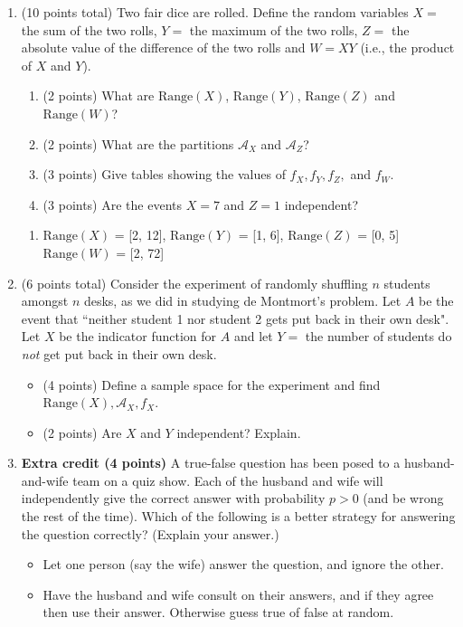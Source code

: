 \documentclass[11pt]{article}
\newcommand{\Range}{{\mathrm{Range}}}
\newcommand{\A}{{\mathcal{A}}}
\begin{document}
\begin{enumerate}
\item (10 points total) Two fair dice are rolled.  Define the random variables
$X =$ the sum of the two rolls,
$Y =$ the maximum of the two rolls,
$Z =$ the absolute value of the difference of the two rolls
and $W = XY$ (i.e., the product of $X$ and $Y$).
\begin{enumerate}
 \item (2 points) What are $\Range(X)$, $\Range(Y)$, $\Range(Z)$ and
 $\Range(W)$?

 \item (2 points) What are the partitions $\A_X$ and $\A_Z$?
 \item (3 points) Give tables showing the values of $f_X,f_Y,f_Z,$ and $f_W$.
 \item (3 points) Are the events $X =7$ and $Z=1$ independent?
\end{enumerate}

\begin{enumerate}
	\item $\Range(X)$ = [2, 12], $\Range(Y)$ = [1, 6], $\Range(Z)$ = [0, 5]
	$\Range(W)$ = [2, 72]
\end{enumerate}

\item (6 points total) Consider the experiment of randomly shuffling
$n$ students amongst $n$ desks, as we did in studying de Montmort's problem.
Let $A$ be the event that ``neither student 1 nor student 2 gets
put back in their own desk".
Let $X$ be the indicator function for $A$ and let $Y = $ the number of
students do \emph{not} get put back in their own desk.

\begin{itemize}
\item (4 points) Define a sample space for the experiment and find 
$\Range(X), \A_X, f_X$.
\item (2 points) Are $X$ and $Y$ independent?  Explain.
\end{itemize}

\item \textbf{Extra credit (4 points)} A true-false question has been
posed to a husband-and-wife team on a quiz show.  Each of the husband
and wife will independently give the correct answer with probability $p>0$
(and be wrong the rest of the time).
Which of the following is a better strategy for answering the question 
correctly?  (Explain your answer.)
\begin{itemize}
\item Let one person (say the wife) answer the question, and ignore the other.
\item Have the husband and wife consult on their answers, and if they agree
then use their answer.  Otherwise guess true of false at random.
\end{itemize}
\end{enumerate}
\end{document}
